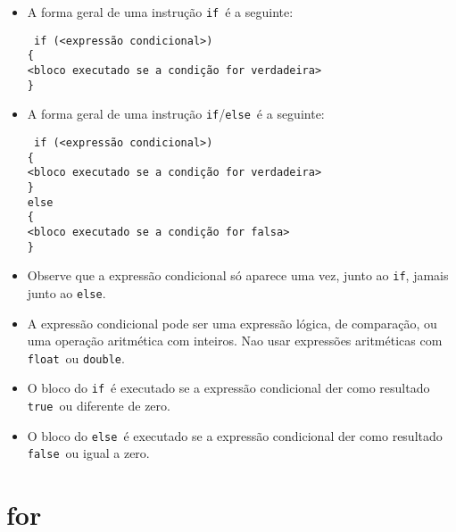\documentclass{book}
\newcommand{\TAB}{{\hspace*{1cm}}}
\newcommand{\FLOAT}{{\tt float}}
\newcommand{\DOUBLE}{{\tt double}}
\newcommand{\IF}{{\tt if}}
\newcommand{\ELSE}{{\tt else}}
\newcommand{\TRUE}{{\tt true}}
\newcommand{\FALSE}{{\tt false}}
\begin{document}
\begin{itemize}

\item A forma geral de uma instrução \IF\ é a seguinte:

{\tt 
if (<expressão condicional>)                     \\
\{                                               \\
\TAB <bloco executado se a condição for verdadeira>  \\
\}                                               \\
}

\item A forma geral de uma instrução \IF/\ELSE\ é a seguinte:

{\tt 
if (<expressão condicional>)                     \\
\{                                               \\
\TAB <bloco executado se a condição for verdadeira>  \\
\}                                               \\
else                                             \\
\{                                               \\
\TAB <bloco executado se a condição for falsa>   \\
\}                                               \\
}

\item Observe que a expressão condicional só aparece uma vez, junto ao \IF, jamais junto ao \ELSE.

\item A expressão condicional pode ser uma expressão lógica, de comparação, ou uma operação aritmética com inteiros. Nao usar expressões aritméticas com \FLOAT\ ou \DOUBLE.
\item O bloco do \IF\ é executado se a expressão condicional der como resultado \TRUE\ ou diferente de zero.
\item O bloco do \ELSE\ é executado se a expressão condicional der como resultado \FALSE\ ou igual a zero.

\end{itemize}


\section{for}
\label{sec:for}
\end{document}
